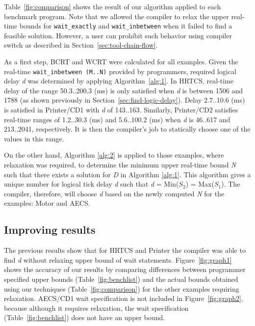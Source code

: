 
Table~\ref{fig:comparison} shows the result of our algorithm applied to
each benchmark program. Note that we allowed the compiler to relax the
upper real-time bounds for \texttt{wait\_exactly} and
\texttt{wait\_inbetween} when it failed to find a feasible solution.
However, a user can prohibit such behavior using compiler switch as
described in Section~\ref{sec:tool-chain-flow}.

As a first step, BCRT and WCRT were calculated for all examples. Given
the real-time \mbox{\texttt{wait\_inbetween (M..N)}} provided by
programmers, required logical delay \textit{d} was determined by
applying Algorithm~\ref{alg:1}. In HRTCS, real-time delay of the range
50.3..200.3 (ms) is only satisfied when \emph{d} is between 1506 and
1788 (as shown previously in Section~\ref{sec:find-logic-delay}). Delay
2.7..10.6 (ms) is satisfied in Printer/CD1 with \emph{d} of 143..163.
Similarly, Printer/CD2 satisfies real-time ranges of 1.2..30.3 (ms) and
5.6..100.2 (ms) when \emph{d} is 46..617 and 213..2041, respectively. It
is then the compiler's job to statically choose one of the values in
this range.

On the other hand, Algorithm \ref{alg:2} is applied to those examples,
where relaxation was required, to determine the minimum upper real-time
bound \emph{N} such that there exists a solution for \emph{D} in
Algorithm \ref{alg:1}. This algorithm gives a unique number for logical
tick delay \emph{d} such that \emph{d} = Min(\emph{$S_2$}) =
Max(\emph{$S_1$}). The compiler, therefore, will choose \emph{d} based
on the newly computed \emph{N} for the examples: Motor and AECS.

\subsection{Improving results}

The previous results show that for HRTCS and Printer the compiler was
able to find \textit{d} without relaxing upper bound of wait
statements. Figure~\ref{fig:graph1} shows the accuracy of our results by
comparing differences between programmer specified upper bounds
(Table~\ref{fig:benchlist}) and the actual bounds obtained using our
techniques (Table~\ref{fig:comparison}) for the other examples requiring
relaxation. AECS/CD1 wait specification is not included in
Figure~\ref{fig:graph2}, because although it requires relaxation, the
wait specification (Table~\ref{fig:benchlist}) does not have an upper
bound.

